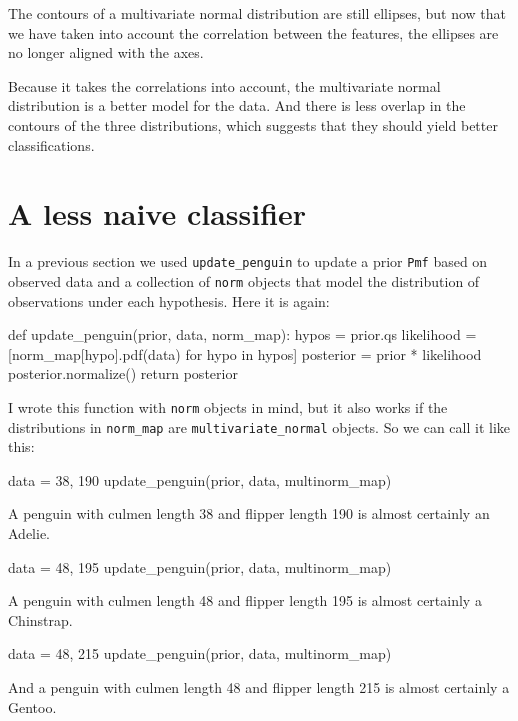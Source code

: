 \documentclass[12pt]{book}
\theoremstyle{exercise}
\newcommand{\py}[1]{{\tt #1}}%
\begin{document}
The contours of a multivariate normal distribution are still ellipses,
but now that we have taken into account the correlation between the
features, the ellipses are no longer aligned with the axes.

Because it takes the correlations into account, the multivariate normal
distribution is a better model for the data. And there is less overlap
in the contours of the three distributions, which suggests that they
should yield better classifications.

\section{A less naive classifier}
\label{a-less-naive-classifier}

In a previous section we used \py{update_penguin}
to update a prior \py{Pmf} based on observed data
and a collection of \py{norm} objects that model
the distribution of observations under each hypothesis. Here it is
again:

\begin{code}
def update_penguin(prior, data, norm_map):
    hypos = prior.qs
    likelihood = [norm_map[hypo].pdf(data) for hypo in hypos]
    posterior = prior * likelihood
    posterior.normalize()
    return posterior
\end{code}

I wrote this function with \py{norm} objects in
mind, but it also works if the distributions in
\py{norm_map} are
\py{multivariate_normal} objects. So we can call
it like this:

\begin{code}
data = 38, 190
update_penguin(prior, data, multinorm_map)
\end{code}

A penguin with culmen length 38 and flipper length 190 is almost
certainly an Adelie.

\begin{code}
data = 48, 195
update_penguin(prior, data, multinorm_map)
\end{code}

A penguin with culmen length 48 and flipper length 195 is almost
certainly a Chinstrap.

\begin{code}
data = 48, 215
update_penguin(prior, data, multinorm_map)
\end{code}

And a penguin with culmen length 48 and flipper length 215 is almost
certainly a Gentoo.
\end{document}
